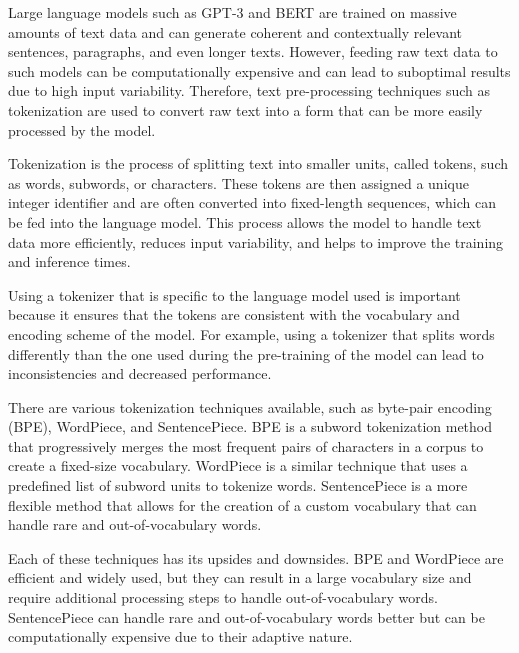     Large language models such as GPT-3 \cite{brownLanguageModelsAre2020} and BERT \cite{devlinBERTPretrainingDeep2019} are trained on massive amounts of text data and can generate coherent and contextually relevant sentences, paragraphs, and even longer texts. However, feeding raw text data to such models can be computationally expensive and can lead to suboptimal results due to high input variability. Therefore, text pre-processing techniques such as tokenization are used to convert raw text into a form that can be more easily processed by the model.
    
    Tokenization is the process of splitting text into smaller units, called tokens, such as words, subwords, or characters. These tokens are then assigned a unique integer identifier and are often converted into fixed-length sequences, which can be fed into the language model. This process allows the model to handle text data more efficiently, reduces input variability, and helps to improve the training and inference times.
    
    Using a tokenizer that is specific to the language model used is important because it ensures that the tokens are consistent with the vocabulary and encoding scheme of the model. For example, using a tokenizer that splits words differently than the one used during the pre-training of the model can lead to inconsistencies and decreased performance.
    
    There are various tokenization techniques available, such as byte-pair encoding (BPE), WordPiece, and SentencePiece. BPE is a subword tokenization method that progressively merges the most frequent pairs of characters in a corpus to create a fixed-size vocabulary. WordPiece is a similar technique that uses a predefined list of subword units to tokenize words. SentencePiece is a more flexible method that allows for the creation of a custom vocabulary that can handle rare and out-of-vocabulary words.
    
    Each of these techniques has its upsides and downsides. BPE and WordPiece are efficient and widely used, but they can result in a large vocabulary size and require additional processing steps to handle out-of-vocabulary words. SentencePiece can handle rare and out-of-vocabulary words better but can be computationally expensive due to their adaptive nature.